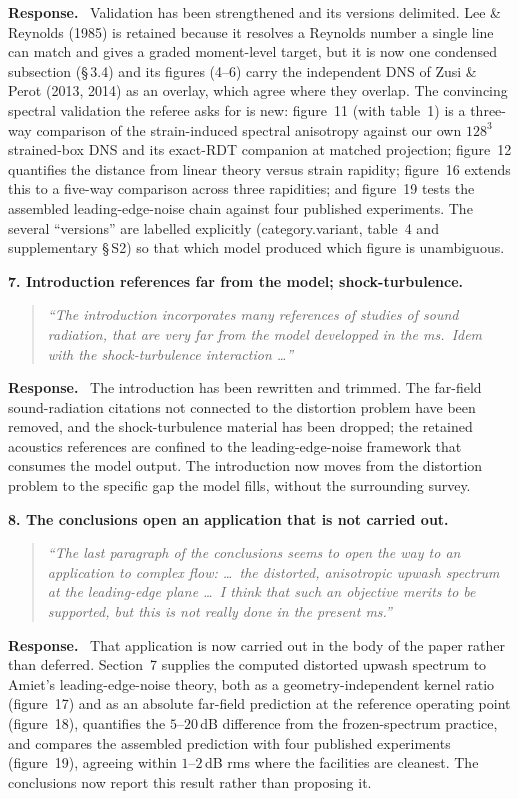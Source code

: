 \documentclass[11pt]{article}
\newenvironment{refcomment}%
  {\begin{quote}\color{commentgray}\itshape}%
  {\end{quote}}
\newcommand{\response}{\medskip\noindent\textbf{Response.}\ }
\newcommand{\point}[1]{\bigskip\noindent\textbf{#1}}
\begin{document}
\response
Validation has been strengthened and its versions delimited. Lee \&
Reynolds (1985) is retained because it resolves a Reynolds number a single
line can match and gives a graded moment-level target, but it is now one
condensed subsection (\S\,3.4) and its figures (4--6) carry the independent
DNS of Zusi \& Perot (2013, 2014) as an overlay, which agree where they
overlap. The convincing spectral validation the referee asks for is new:
figure~11 (with table~1) is a three-way comparison of the strain-induced
spectral anisotropy against our own $128^3$ strained-box DNS and its
exact-RDT companion at matched projection; figure~12 quantifies the
distance from linear theory versus strain rapidity; figure~16 extends this
to a five-way comparison across three rapidities; and figure~19 tests the
assembled leading-edge-noise chain against four published experiments. The
several ``versions'' are labelled explicitly (category.variant, table~4 and
supplementary \S\,S2) so that which model produced which figure is
unambiguous.

\point{7. Introduction references far from the model; shock-turbulence.}
\begin{refcomment}
``The introduction incorporates many references of studies of sound
radiation, that are very far from the model developped in the ms.\ Idem
with the shock-turbulence interaction \ldots''
\end{refcomment}

\response
The introduction has been rewritten and trimmed. The far-field
sound-radiation citations not connected to the distortion problem have been
removed, and the shock-turbulence material has been dropped; the retained
acoustics references are confined to the leading-edge-noise framework that
consumes the model output. The introduction now moves from the distortion
problem to the specific gap the model fills, without the surrounding survey.

\point{8. The conclusions open an application that is not carried out.}
\begin{refcomment}
``The last paragraph of the conclusions seems to open the way to an
application to complex flow: \ldots\ the distorted, anisotropic upwash
spectrum at the leading-edge plane \ldots\ I think that such an objective
merits to be supported, but this is not really done in the present ms.''
\end{refcomment}

\response
That application is now carried out in the body of the paper rather than
deferred. Section~7 supplies the computed distorted upwash spectrum to
Amiet's leading-edge-noise theory, both as a geometry-independent kernel
ratio (figure~17) and as an absolute far-field prediction at the reference
operating point (figure~18), quantifies the $5$--$20$\,dB difference from
the frozen-spectrum practice, and compares the assembled prediction with
four published experiments (figure~19), agreeing within $1$--$2$\,dB rms
where the facilities are cleanest. The conclusions now report this result
rather than proposing it.
\end{document}
